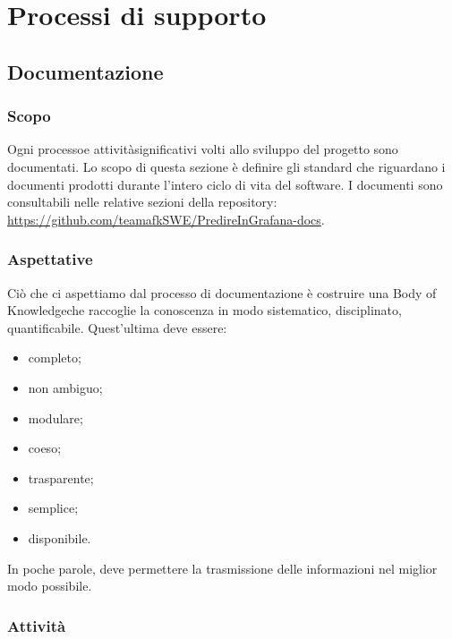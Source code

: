 \section{Processi di supporto}
\subsection{Documentazione}
\subsubsection{Scopo}
Ogni processo\glo e attività\glo significativi volti allo sviluppo del progetto sono documentati. Lo scopo di questa sezione è definire gli standard che riguardano i documenti prodotti durante l'intero ciclo di vita del software. I documenti sono consultabili nelle relative sezioni della repository\glo: \url{https://github.com/teamafkSWE/PredireInGrafana-docs}. 		

\subsubsection{Aspettative}
Ciò che ci aspettiamo dal processo di documentazione è costruire una Body of Knowledge\glo che raccoglie la conoscenza in modo sistematico, disciplinato, quantificabile. Quest'ultima deve essere: \begin{itemize}
\item completo;
\item non ambiguo;
\item modulare;
\item coeso;
\item trasparente;
\item semplice;
\item disponibile.
\end{itemize}
In poche parole, deve permettere la trasmissione delle informazioni nel miglior modo possibile.
\subsubsection{Attività}
